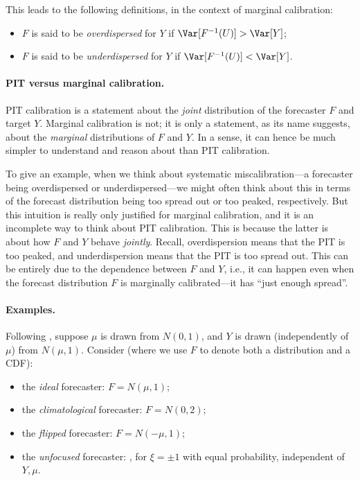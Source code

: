 \documentclass{article}
\begin{document}
This leads to the following definitions, in the context of marginal calibration:      

\begin{itemize}
\item $F$ is said to be \emph{overdispersed} for $Y$ if $\Var[F^{-1}(U)] > \Var[Y]$;
\item $F$ is said to be \emph{underdispersed} for $Y$ if $\Var[F^{-1}(U)] < \Var[Y]$.
\end{itemize}

\paragraph{PIT versus marginal calibration.}

PIT calibration is a statement about the \emph{joint} distribution of the
forecaster $F$ and target $Y$. Marginal calibration is not; it is only a
statement, as its name suggests, about the \emph{marginal} distributions of $F$
and $Y$. In a sense, it can hence be much simpler to understand and reason about 
than PIT calibration.

To give an example, when we think about systematic miscalibration---a forecaster 
being overdispersed or underdispersed---we might often think about this in terms 
of the forecast distribution being too spread out or too peaked, respectively.
But this intuition is really only justified for marginal calibration, and it is an
incomplete way to think about PIT calibration. This is because the latter is
about how $F$ and $Y$ behave \emph{jointly}. Recall, overdispersion means that
the PIT is too peaked, and underdispersion means that the PIT is too spread
out. This can be entirely due to the dependence between $F$ and $Y$, i.e., it
can happen even when the forecast distribution $F$ is marginally calibrated---it
has ``just enough spread''.

\paragraph{Examples.}

Following \citet{gneiting2007probabilistic}, suppose $\mu$ is drawn from $N(0, 
1)$, and $Y$ is drawn (independently of $\mu$) from $N(\mu, 1)$. Consider (where
we use $F$ to denote both a distribution and a CDF):

\begin{itemize}
\item the \emph{ideal} forecaster: $F = N(\mu, 1)$;
\item the \emph{climatological} forecaster: $F = N(0, 2)$;
\item the \emph{flipped} forecaster: $F = N(-\mu, 1)$;  
\item the \emph{unfocused} forecaster: , for $\xi = \pm 1$ with equal probability, independent 
  of $Y,\mu$.
\end{itemize}
\end{document}
